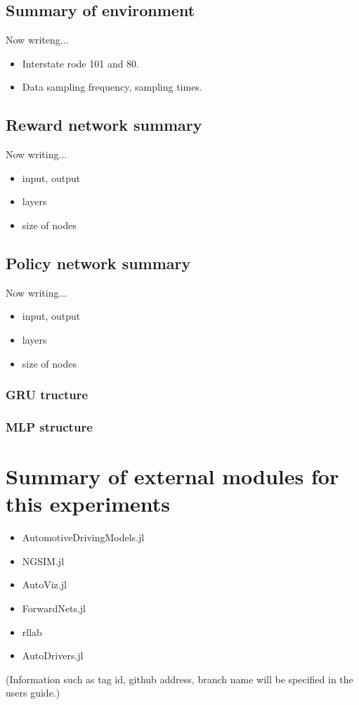 \subsection{Summary of environment}

Now writeng...

\begin{itemize}
\item Interstate rode 101 and 80.
\item Data sampling frequency, sampling times.
\end{itemize}


\subsection{Reward network summary}

Now writing...
\begin{itemize}
\item input, output
\item layers
\item size of nodes
\end{itemize}


\subsection{Policy network summary}

Now writing...
\begin{itemize}
\item input, output
\item layers
\item size of nodes
\end{itemize}

\subsubsection{GRU tructure}

\subsubsection{MLP structure}


\section{Summary of external modules for this experiments}

\begin{itemize}
\item AutomotiveDrivingModels.jl
\item NGSIM.jl
\item AutoViz.jl
\item ForwardNets.jl
\item rllab
\item AutoDrivers.jl
\end{itemize}

(Information such as tag id, github address, branch name will be specified in the users guide.)

